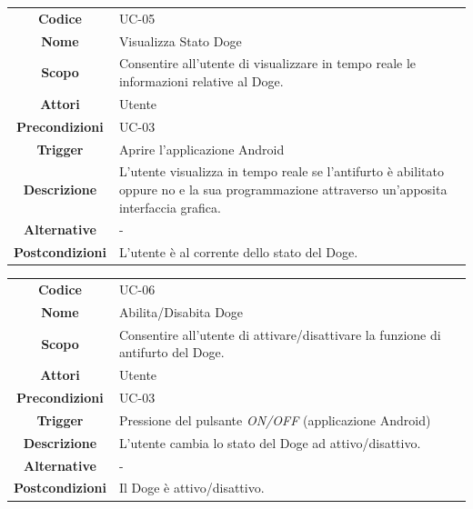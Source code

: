 \documentclass{article}
\begin{document}
    \begin{adjustbox}{center}
    \begin{tabular}{|c|p{10cm}|}
    \hline
    \textbf{Codice} & UC-05 \\
    \textbf{Nome} & Visualizza Stato Doge \\
    \textbf{Scopo} & Consentire all'utente di visualizzare in tempo reale le informazioni relative al Doge. \\
    \textbf{Attori} & Utente \\
    \textbf{Precondizioni} & UC-03 \\
    \textbf{Trigger} & Aprire l'applicazione Android \\
    \textbf{Descrizione} & L'utente visualizza in tempo reale se l'antifurto è abilitato oppure no e la sua programmazione attraverso un'apposita interfaccia
    grafica. \\
    \textbf{Alternative} & - \\
    \textbf{Postcondizioni} & L'utente è al corrente dello stato del Doge. \\
    \hline
    \end{tabular}
    \end{adjustbox}
    
    \begin{adjustbox}{center}
    \begin{tabular}{|c|p{10cm}|}
    \hline
    \textbf{Codice} & UC-06 \\
    \textbf{Nome} & Abilita/Disabita Doge \\
    \textbf{Scopo} & Consentire all'utente di attivare/disattivare la funzione di antifurto del Doge. \\
    \textbf{Attori} & Utente \\
    \textbf{Precondizioni} & UC-03 \\
    \textbf{Trigger} & Pressione del pulsante \emph{ON/OFF} (applicazione Android) \\
    \textbf{Descrizione} & L'utente cambia lo stato del Doge ad attivo/disattivo. \\
    \textbf{Alternative} & - \\
    \textbf{Postcondizioni} & Il Doge è attivo/disattivo. \\
    \hline
    \end{tabular}
    \end{adjustbox}
    
\end{document}
